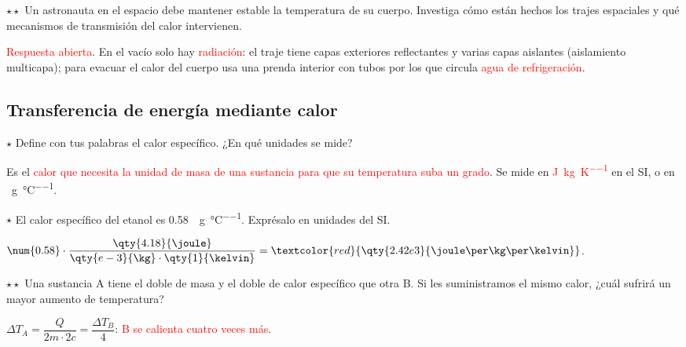 \begin{exercise}
    \(\star\star\) Un astronauta en el espacio debe mantener estable la temperatura de su cuerpo. Investiga cómo están hechos los
    trajes espaciales y qué mecanismos de transmisión del calor intervienen.
    \begin{solu}
        \textcolor{red}{Respuesta abierta}. En el vacío solo hay \textcolor{red}{radiación}: el traje tiene capas exteriores
        reflectantes y varias capas aislantes (aislamiento multicapa); para evacuar el calor del cuerpo usa una prenda interior con
        tubos por los que circula \textcolor{red}{agua de refrigeración}.
    \end{solu}
\end{exercise}

\subsection{Transferencia de energía mediante calor}

\begin{exercise}
    \(\star\) Define con tus palabras el calor específico. ¿En qué unidades se mide?
    \begin{solu}
        Es el \textcolor{red}{calor que necesita la unidad de masa de una sustancia para que su temperatura suba un grado}. Se mide
        en \textcolor{red}{\unit{\joule\per\kg\per\kelvin}} en el SI, o en \unit{\calorie\per\g\per\degreeCelsius}.
    \end{solu}
\end{exercise}

\begin{exercise}
    \(\star\) El calor específico del etanol es \qty{0.58}{\calorie\per\g\per\degreeCelsius}. Exprésalo en unidades del SI.
    \begin{solu}
        \(\num{0.58} \cdot \dfrac{\qty{4.18}{\joule}}{\qty{e-3}{\kg} \cdot \qty{1}{\kelvin}} = \textcolor{red}{\qty{2.42e3}{\joule\per\kg\per\kelvin}}\).
    \end{solu}
\end{exercise}

\begin{exercise}
    \(\star\star\) Una sustancia A tiene el doble de masa y el doble de calor específico que otra B. Si les suministramos el mismo
    calor, ¿cuál sufrirá un mayor aumento de temperatura?
    \begin{solu}
        \(\Delta T_A = \dfrac{Q}{2m \cdot 2c} = \dfrac{\Delta T_B}{4}\): \textcolor{red}{B se calienta cuatro veces más}.
    \end{solu}
\end{exercise}


